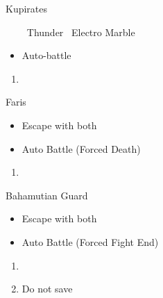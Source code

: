 \begin{battle}[]{Kupirates}
	\begin{itemize}
		\reynnf\ Thunder
		\lannf\ Electro Marble
		\item Auto-battle
	\end{itemize}
\end{battle}
\begin{enumerate}[resume]
	\item \cs\
\end{enumerate}
\begin{battle}[]{Faris}
	\begin{itemize}
		\item Escape with both
		\item Auto Battle (Forced Death)
	\end{itemize}
\end{battle}
\begin{enumerate}[resume]
	\item \cs\
\end{enumerate}
\begin{battle}[]{Bahamutian Guard}
	\begin{itemize}
		\item Escape with both
		\item Auto Battle (Forced Fight End)
	\end{itemize}
\end{battle}
\begin{enumerate}[resume]
	\item \cs\
	\item Do not save
\end{enumerate}